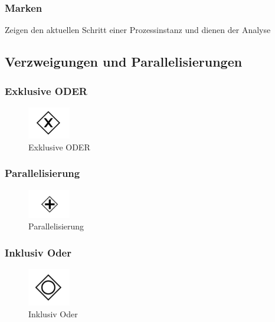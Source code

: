     \subsubsection*{Marken}
    Zeigen den aktuellen Schritt einer Prozessinstanz und dienen der Analyse

\subsection{Verzweigungen und Parallelisierungen}
    \subsubsection*{Exklusive ODER}
        \begin{figure}[h]
            \centering
            \includegraphics[width=70px]{image/XOR.png}
            \caption{Exklusive ODER}
            \label{fig:XOR}
        \end{figure}
    \subsubsection*{Parallelisierung}
        \begin{figure}[h]
            \centering
            \includegraphics[width=70px]{image/Parallelisierung.png}
            \caption{Parallelisierung}
            \label{fig:Parallelisierung}
        \end{figure}
    \subsubsection*{Inklusiv Oder}
        \begin{figure}[h]
            \centering
            \includegraphics[width=70px]{image/inklusiv-oder.png}
            \caption{Inklusiv Oder}
            \label{fig:inklusiv-oder}
        \end{figure}


